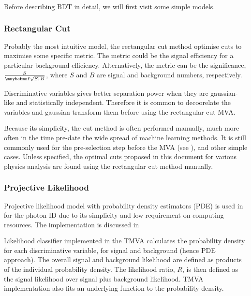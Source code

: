 Before describing BDT in detail, we will first visit some simple models.


\subsubsection{Rectangular Cut}

Probably the most intuitive model, the rectangular cut method optimise cuts to maximise some specific metric. The metric could be the signal efficiency for a particular background efficiency. Alternatively, the metric can be the significance, $\frac{S}{\rootOf{S\!+\!B}}$, where $S$ and $B$ are signal and background numbers, respectively.

Discriminative variables gives better separation power when they are gaussian-like and statistically independent. Therefore it is common to decoorelate  the variables and gaussian transform them before using the rectangular cut MVA.

Because its simplicity, the cut method is often performed manually, much more often in the time pre-date the wide spread of machine learning methods. It is still commonly used for the pre-selection step before the MVA (see ), and other simple cases. Unless specified, the optimal cuts proposed in this document for various physics analysis are found using the rectangular cut method manually.

\subsubsection{Projective Likelihood}
\label{sec:pandoraLikelihood}

Projective likelihood model with probability density estimators (PDE) is used in \pandora for the photon ID  due to its simplicity and low requirement on computing resources. The \pandora implementation is discussed  in 

Likelihood classifier implemented in the TMVA calculates the probability density for each discriminative variable, for signal and background (hence PDE approach). The overall signal and background likelihood are defined as products of the individual probability density. The likelihood ratio, $R$, is then defined as the signal likelihood over signal plus background likelihood. TMVA implementation also fits an underlying function to the probability density.

